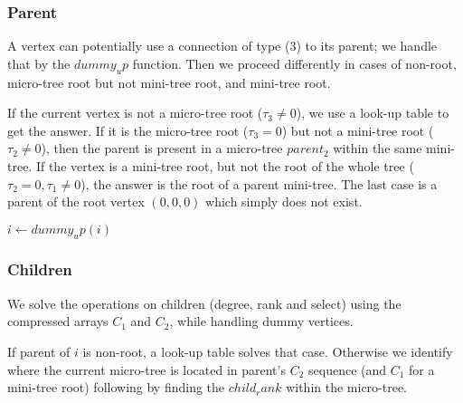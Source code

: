 \subsubsection{Parent}

A vertex can potentially use a connection of type (3) to its parent; we handle that by the $dummy_up$ function.
Then we proceed differently in cases of non-root, micro-tree root but not mini-tree root, and mini-tree root.

If the current vertex is not a micro-tree root ($\tau_3 \ne 0$), we use a look-up table to get the answer.
If it is the micro-tree root ($\tau_3 = 0$) but not a mini-tree root ($\tau_2 \ne 0$), then the parent is present in a micro-tree $parent_2$ within the same mini-tree.
If the vertex is a mini-tree root, but not the root of the whole tree ($\tau_2 = 0, \tau_1 \ne 0$), the answer is the root of a parent mini-tree.
The last case is a parent of the root vertex $(0, 0, 0)$ which simply does not exist.

\begin{algorithmic}
	\State $i \gets dummy_up(i)$
		\State {}
		\State {}
		\State {}
	\Else
		\State {}
	\EndIf
\EndFunction
\end{algorithmic}

\subsubsection{Children}

We solve the operations on children (degree, rank and select) using the compressed arrays $C_1$ and $C_2$, while handling dummy vertices.

\begin{algorithmic}
		\State {}
		\State {}
	\Else
		\State {}
	\EndIf
\EndFunction
\end{algorithmic}

If parent of $i$ is non-root, a look-up table solves that case.
Otherwise we identify where the current micro-tree is located in parent's $C_2$ sequence (and $C_1$ for a mini-tree root) following by finding the $child_rank$ within the micro-tree.

